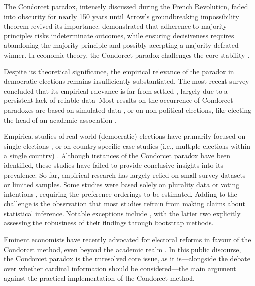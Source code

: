 \documentclass[12pt]{scrartcl}
\begin{document}
The Condorcet paradox, intensely discussed during the French Revolution, faded into obscurity for nearly 150 years \citep[][p.~99]{Rothschild2005, McLean2019} until Arrow’s groundbreaking impossibility theorem revived its importance.  \citet{Arrow1950} demonstrated that adherence to majority principles risks indeterminate outcomes, while ensuring decisiveness requires abandoning the majority principle and possibly accepting a majority-defeated winner. In economic theory, the Condorcet paradox challenges the core stability \citep{Moulin2014}.

Despite its theoretical significance, the empirical relevance of the paradox in democratic elections remains insufficiently substantiated. The most recent survey concluded that its empirical relevance is far from settled \citep{VanDeemen2013}, largely due to a persistent lack of reliable data. Most results on the occurrence of Condorcet paradoxes are based on simulated data \citep{Lepelley2001, Gehrlein2006, Sauermann2022}, or on non-political elections, like electing the head of an academic association \citep{Chamberlin1984, Feld1992, Regenwetter2007, Tideman2009, Popov2014}.

Empirical studies of real-world (democratic) elections have primarily focused on single elections \citep{Kurrild2018, Darmann2019, Potthoff2021}, or on country-specific case studies (i.e., multiple elections within a single country) \citep{Abramson1995, vanDeemen1998, KurrildKlitgaard2001, KurrildKlitgaard2008}. Although instances of the Condorcet paradox have been identified, these studies have failed to provide conclusive insights into its prevalence. So far, empirical research has largely relied on small survey datasets or limited samples. Some studies were based solely on plurality data \citep[e.g.,][]{Riker1988} or voting intentions \citep[e.g.,][]{McDonald2012}, requiring the preference orderings to be estimated. Adding to the challenge is the observation that most studies refrain from making claims about statistical inference. Notable exceptions include \cite{Desai2025, Regenwetter2007, Darmann2019}, with the latter two explicitly assessing the robustness of their findings through bootstrap methods.

Eminent economists have recently advocated for electoral reforms in favour of the Condorcet method, even beyond the academic realm \citep{Maskin2016, Maskin2017, Maskin2017a}. In this public discourse, the Condorcet paradox is the unresolved core issue, as it is—alongside the debate over whether cardinal information should be considered—the main argument against the practical implementation of the Condorcet method.
\end{document}
